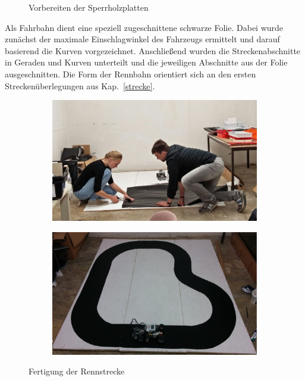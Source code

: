 \documentclass[a4paper,12pt]{article}                                         %
\numberwithin{table}{section}                               %
\numberwithin{figure}{section}                              %
\begin{document}
\begin{figure}[h!]
\begin{subfigure}{.5\textwidth}
	  \label{fig:sub2}
	\end{subfigure}
	\vspace{10pt}
	\caption{Vorbereiten der Sperrholzplatten}
	\label{fig:gebauteStrecke}	
	\end{figure}
	
	Als Fahrbahn dient eine speziell zugeschnittene schwarze Folie. Dabei wurde zunächst der maximale Einschlagwinkel des Fahrzeugs ermittelt und darauf basierend die Kurven vorgezeichnet. Anschließend wurden die Streckenabschnitte in Geraden und Kurven unterteilt und die jeweiligen Abschnitte aus der Folie ausgeschnitten. Die Form der Rennbahn orientiert sich an den ersten Streckenüberlegungen aus Kap.~\ref{strecke}.
	\smallskip
	
		\begin{figure}[h!]
		\centering
		\begin{subfigure}{.5\textwidth}
		  \centering
		  \includegraphics[width=.8\linewidth]{../Bilder/zeichnen.jpg}
		  \label{fig:sub3}
		\end{subfigure}%
		\begin{subfigure}{.5\textwidth}
		  \centering
		  \includegraphics[width=.8\linewidth]{../Bilder/rennstreckefertig.jpg}
		  \label{fig:sub4}
		\end{subfigure}
		\vspace{10pt}
		\caption{Fertigung der Rennstrecke}
		\label{fig:gebauteStrecke2}	
		\end{figure}
	
\end{document}
